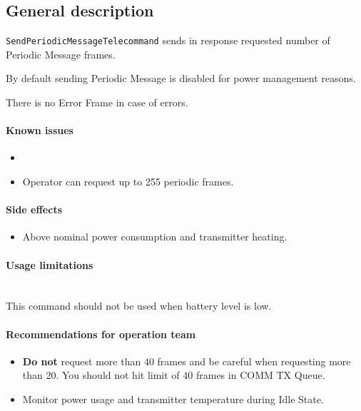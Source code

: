 

\subsection{General description}
\texttt{SendPeriodicMessageTelecommand} sends in response requested number of Periodic Message frames.

By default sending Periodic Message is disabled for power management reasons.

There is no Error Frame in case of errors.

\paragraph{Known issues}
\begin{itemize}
	\item {}
	\item Operator can request up to 255 periodic frames.
\end{itemize}

\paragraph{Side effects}
\begin{itemize}
	\item Above nominal power consumption and transmitter heating.
\end{itemize}

\paragraph{Usage limitations}\mbox{}\\ 
This command should not be used when battery level is low.

\paragraph{Recommendations for operation team}
\begin{itemize}
	\item \textbf{Do not} request more than 40 frames and be careful when requesting more than 20. You should not hit limit of 40 frames in COMM TX Queue.
	\item Monitor power usage and transmitter temperature during Idle State.
\end{itemize}

